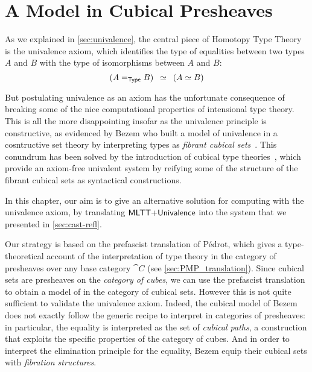 \setchapterpreamble[u]{\margintoc}
\chapter{A Model in Cubical Presheaves}


As we explained in \cref{sec:univalence}, the central piece of Homotopy Type 
Theory is the univalence axiom, which identifies the type of equalities between 
two types \( A \) and \( B \) with the type of isomorphisms between \( A \) and \( B \):
% 
\[
(A =_{\mathsf{Type}} B) \enskip \simeq \enskip  (A \simeq B)
\]

But postulating univalence as an axiom has the unfortunate consequence of 
breaking some of the nice computational properties of intensional type theory.
% 
This is all the more disappointing insofar as the univalence principle is 
constructive, as evidenced by Bezem \etal who built a model of 
univalence in a cosntructive set theory by interpreting types as \emph{fibrant 
cubical sets}~.
% 
This conundrum has been solved by the introduction of cubical type 
theories~, which provide an axiom-free univalent system by reifying 
some of the structure of the fibrant cubical sets as syntactical constructions.

In this chapter, our aim is to give an alternative solution for computing with
the univalence axiom, by translating \( \mathsf{MLTT}{+}\mathsf{Univalence} \) into the 
system \SetoidCCplus that we presented in \cref{sec:cast-refl}.

Our strategy is based on the prefascist translation of Pédrot, which gives a 
type-theoretical account of the interpretation of type theory in the category 
of presheaves over any base category \( \cat{C} \) (see \cref{sec:PMP_translation}).
% 
Since cubical sets are presheaves on the \emph{category of cubes}, we can use
the prefascist translation to obtain a model of \MLTT in the category of 
cubical sets. 
% 
However this is not quite sufficient to validate the univalence axiom.
% 
Indeed, the cubical model of Bezem \etal does not exactly follow the generic
recipe to interpret \MLTT in categories of presheaves: in particular, the
equality is interpreted as the set of \emph{cubical paths}, a construction that 
exploits the specific properties of the category of cubes.
% 
And in order to interpret the elimination principle for the equality, Bezem 
\etal equip their cubical sets with \emph{fibration structures}.

